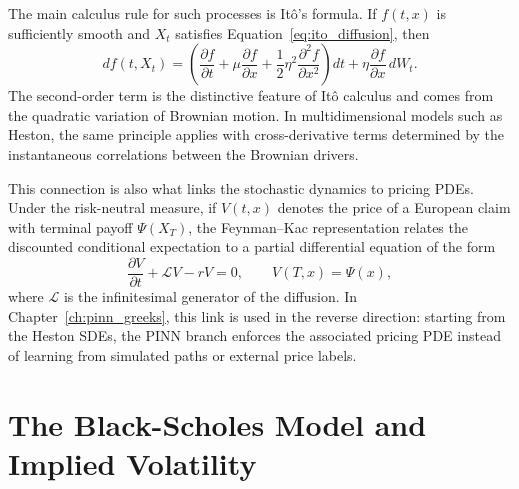 The main calculus rule for such processes is It\^o's formula. If $f(t,x)$ is sufficiently smooth and $X_t$ satisfies Equation~\eqref{eq:ito_diffusion}, then
\begin{equation}
    \label{eq:ito_formula}
    df(t,X_t)
    =
    \left(
    \frac{\partial f}{\partial t}
    +\mu\frac{\partial f}{\partial x}
    +\frac{1}{2}\eta^2\frac{\partial^2 f}{\partial x^2}
    \right)dt
    +\eta\frac{\partial f}{\partial x}\,dW_t.
\end{equation}
The second-order term is the distinctive feature of It\^o calculus and comes from the quadratic variation of Brownian motion. In multidimensional models such as Heston, the same principle applies with cross-derivative terms determined by the instantaneous correlations between the Brownian drivers.

This connection is also what links the stochastic dynamics to pricing PDEs. Under the risk-neutral measure, if $V(t,x)$ denotes the price of a European claim with terminal payoff $\Psi(X_T)$, the Feynman--Kac representation relates the discounted conditional expectation to a partial differential equation of the form
\begin{equation}
    \label{eq:feynman_kac_generic}
    \frac{\partial V}{\partial t}
    +\mathcal{L}V
    -rV
    =0,
    \qquad
    V(T,x)=\Psi(x),
\end{equation}
where $\mathcal{L}$ is the infinitesimal generator of the diffusion. In Chapter~\ref{ch:pinn_greeks}, this link is used in the reverse direction: starting from the Heston SDEs, the PINN branch enforces the associated pricing PDE instead of learning from simulated paths or external price labels.

\section{The Black-Scholes Model and Implied Volatility}
\label{sec:black_scholes_model}

